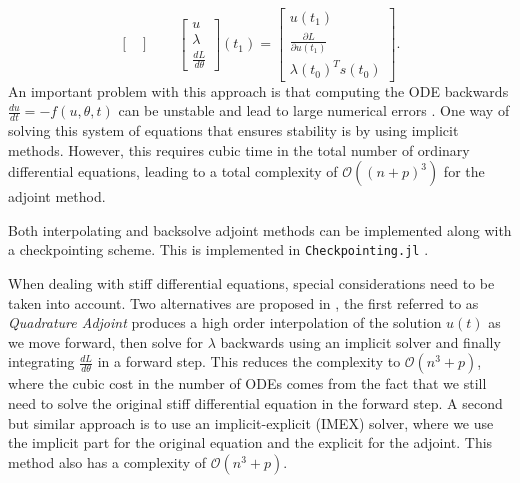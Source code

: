 \begin{enumerate}[label=(\roman*)]
\begin{equation}
\begin{bmatrix}
    \end{bmatrix}
    \qquad 
    \begin{bmatrix}
       u \\
       \lambda \\
       \frac{dL}{d\theta}
    \end{bmatrix}(t_1)
    = 
    \begin{bmatrix}
       u(t_1) \\
       \frac{\partial L}{\partial u(t_1)} \\
       \lambda(t_0)^T s(t_0)
    \end{bmatrix}.
    \end{equation}
    An important problem with this approach is that computing the ODE backwards $\frac{du}{dt} = - f(u,\theta, t)$ can be unstable and lead to large numerical errors \cite{kim_stiff_2021, Zhuang_2020}. 
    One way of solving this system of equations that ensures stability is by using implicit methods. 
    However, this requires cubic time in the total number of ordinary differential equations, leading to a total complexity of $\mathcal O((n+p)^3)$ for the adjoint method.
\end{enumerate} 

Both interpolating and backsolve adjoint methods can be implemented along with a checkpointing scheme. 
This is implemented in \texttt{Checkpointing.jl} \cite{Checkpoiting_2023}.

When dealing with stiff differential equations, special considerations need to be taken into account.
Two alternatives are proposed in \cite{kim_stiff_2021}, the first referred to as \textit{Quadrature Adjoint} produces a high order interpolation of the solution $u(t)$ as we move forward, then solve for $\lambda$ backwards using an implicit solver and finally integrating $\frac{dL}{d\theta}$ in a forward step.
This reduces the complexity to $\mathcal O (n^3 + p)$, where the cubic cost in the number of ODEs comes from the fact that we still need to solve the original stiff differential equation in the forward step. 
A second but similar approach is to use an implicit-explicit (IMEX) solver, where we use the implicit part for the original equation and the explicit for the adjoint. 
This method also has a complexity of $\mathcal O (n^3 + p)$.



